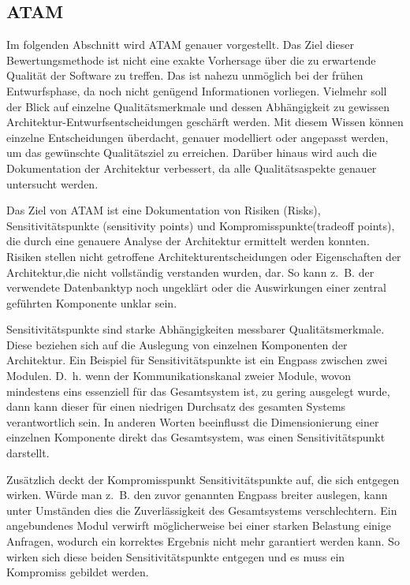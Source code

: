 \subsection{\acf*{ATAM}}

Im folgenden Abschnitt wird \ac{ATAM} genauer vorgestellt. Das Ziel dieser Bewertungsmethode ist nicht eine exakte Vorhersage über die 
zu erwartende Qualität der Software zu treffen. Das ist nahezu unmöglich bei der frühen Entwurfsphase, da noch nicht genügend Informationen 
vorliegen. Vielmehr soll der Blick auf einzelne Qualitätsmerkmale und dessen Abhängigkeit zu gewissen Architektur-Entwurfsentscheidungen geschärft 
werden\cite{Clements2000}. Mit diesem Wissen können einzelne Entscheidungen überdacht, genauer modelliert oder angepasst werden, um das gewünschte 
Qualitätsziel zu erreichen. Darüber hinaus wird auch die Dokumentation der Architektur verbessert, da alle Qualitätsaspekte genauer untersucht werden.

Das Ziel von \ac{ATAM} ist eine Dokumentation von Risiken (Risks), Sensitivitätspunkte (sensitivity points) und Kompromisspunkte(tradeoff points), die durch eine genauere Analyse der Architektur\cite{Clements2000}
ermittelt werden konnten. 
Risiken stellen nicht getroffene Architekturentscheidungen oder Eigenschaften der Architektur,die nicht vollständig
verstanden wurden, dar. So kann z.~B. der verwendete Datenbanktyp noch ungeklärt oder die Auswirkungen einer zentral geführten Komponente unklar sein.

Sensitivitätspunkte sind starke Abhängigkeiten messbarer Qualitätsmerkmale. Diese beziehen sich auf die Auslegung von einzelnen Komponenten der Architektur. Ein Beispiel für Sensitivitätspunkte ist ein Engpass zwischen zwei Modulen. D.~h. wenn der Kommunikationskanal zweier Module, wovon mindestens eins essenziell für das Gesamtsystem ist, zu gering ausgelegt wurde, dann kann dieser für einen niedrigen Durchsatz des gesamten Systems verantwortlich sein. In anderen Worten beeinflusst die Dimensionierung einer einzelnen Komponente direkt das Gesamtsystem, was einen Sensitivitätspunkt darstellt.

Zusätzlich deckt der Kompromisspunkt Sensitivitätspunkte auf, die sich entgegen wirken.
Würde man z.~B. den zuvor genannten Engpass breiter auslegen, kann unter Umständen dies die Zuverlässigkeit des Gesamtsystems verschlechtern. Ein angebundenes Modul verwirft möglicherweise bei einer starken Belastung einige Anfragen, wodurch ein korrektes Ergebnis nicht mehr garantiert werden kann. So wirken sich diese beiden Sensitivitätspunkte entgegen und es muss ein Kompromiss gebildet werden.  
 
